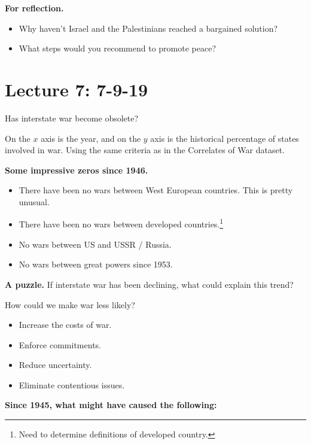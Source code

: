 \documentclass{article}
\begin{document}
{\bf For reflection.}

\begin{itemize}
  \item Why haven't Israel and the Palestinians reached a bargained solution?
  \item What steps would you recommend to promote peace?
\end{itemize}

\section{Lecture 7: 7-9-19}

Has interstate war become obsolete?

On the $x$ axis is the year, and on the $y$ axis is the historical percentage of states involved in war.  Using the same criteria as in the Correlates of War dataset.

{\bf Some impressive zeros since 1946.} 

\begin{itemize}
  \item  There have been no wars between West European countries.  This is pretty unusual.
  \item There have been no wars between developed countries.\footnote{Need to determine definitions of developed country.}
  \item No wars between US and USSR / Russia.
  \item No wars between great powers since 1953.
\end{itemize}

{\bf A puzzle.} If interstate war has been declining, what could explain this trend?

How could we make war less likely?

\begin{itemize}
  \item Increase the costs of war.
  \item Enforce commitments.
  \item Reduce uncertainty.
  \item Eliminate contentious issues.
\end{itemize}

{\bf Since 1945, what might have caused the following:}
\end{document}
